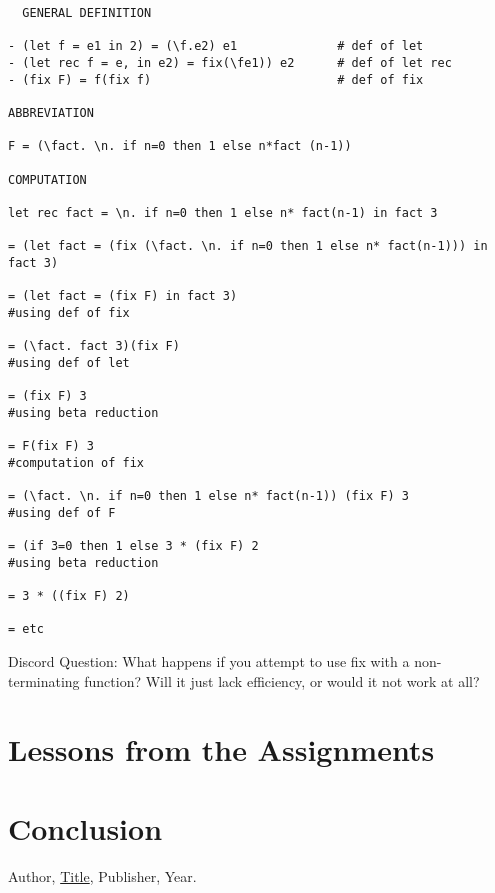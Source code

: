 \documentclass{article}
\theoremstyle{theorem}
\theoremstyle{definition}
\theoremstyle{remark}
\begin{document}
\begin{verbatim}
  GENERAL DEFINITION

- (let f = e1 in 2) = (\f.e2) e1              # def of let
- (let rec f = e, in e2) = fix(\fe1)) e2      # def of let rec
- (fix F) = f(fix f)                          # def of fix

ABBREVIATION

F = (\fact. \n. if n=0 then 1 else n*fact (n-1))

COMPUTATION

let rec fact = \n. if n=0 then 1 else n* fact(n-1) in fact 3

= (let fact = (fix (\fact. \n. if n=0 then 1 else n* fact(n-1))) in fact 3) 

= (let fact = (fix F) in fact 3)                                             #using def of fix

= (\fact. fact 3)(fix F)                                                     #using def of let

= (fix F) 3                                                                  #using beta reduction

= F(fix F) 3                                                                 #computation of fix 

= (\fact. \n. if n=0 then 1 else n* fact(n-1)) (fix F) 3                     #using def of F

= (if 3=0 then 1 else 3 * (fix F) 2                                          #using beta reduction

= 3 * ((fix F) 2)

= etc
\end{verbatim}

Discord Question: What happens if you attempt to use fix with a non-terminating function? Will it just lack efficiency, or would it not work at all?

\section{Lessons from the Assignments}


\section{Conclusion}\label{conclusion}


\begin{thebibliography}{99}
 Author, \href{https://en.wikipedia.org/wiki/LaTeX}{Title}, Publisher, Year.
\end{thebibliography}
\end{document}

